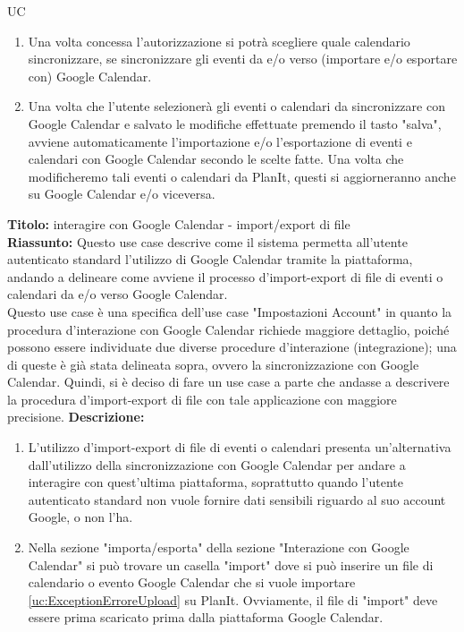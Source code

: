 \begin{listaPersonale}{UC}
\begin{listaPersonale2}[UC] {}
\begin{listaPersonale3}[UC]{}
\begin{enumerate}
                \item Una volta concessa l'autorizzazione si potrà scegliere quale calendario sincronizzare, se sincronizzare gli eventi da e/o verso (importare e/o esportare con) Google Calendar.
                \item Una volta che l'utente selezionerà gli eventi o calendari da sincronizzare con Google Calendar e salvato le modifiche effettuate premendo il tasto "salva", avviene automaticamente l'importazione e/o l'esportazione di eventi e calendari con Google Calendar secondo le scelte fatte. Una volta che modificheremo tali eventi o calendari da PlanIt, questi si aggiorneranno anche su Google Calendar e/o viceversa.
            \end{enumerate}

            \textbf{Titolo: } interagire con Google Calendar - import/export di file\\
            \textbf{Riassunto: } Questo use case descrive come il sistema permetta all'utente autenticato standard l'utilizzo di Google Calendar tramite la piattaforma, andando a delineare come avviene il processo d'import-export di file di eventi o calendari da e/o verso Google Calendar. \\
            Questo use case è una specifica dell'use case "Impostazioni Account" in quanto la procedura d'interazione con Google Calendar richiede maggiore dettaglio, poiché possono essere individuate due diverse procedure d'interazione (integrazione); una di queste è già stata delineata sopra, ovvero la sincronizzazione con Google Calendar. Quindi, si è deciso di fare un use case a parte che andasse a descrivere la procedura d'import-export di file con tale applicazione con maggiore precisione.
            \textbf{Descrizione: }
            \begin{enumerate}
                \item L'utilizzo d'import-export di file di eventi o calendari presenta un'alternativa dall'utilizzo della sincronizzazione con Google Calendar per andare a interagire con quest'ultima piattaforma, soprattutto quando l'utente autenticato standard non vuole fornire dati sensibili riguardo al suo account Google, o non l'ha.
                \item Nella sezione "importa/esporta" della sezione "Interazione con Google Calendar" si può trovare un casella "import" dove si può inserire un file di calendario o evento Google Calendar che si vuole importare \ref{uc:ExceptionErroreUpload} su PlanIt. Ovviamente, il file di "import" deve essere prima scaricato prima dalla piattaforma Google Calendar.

\end{enumerate}
\end{listaPersonale3}
\end{listaPersonale2}
\end{listaPersonale}
